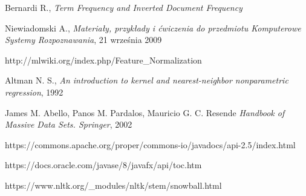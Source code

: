 \documentclass{classrep}
\begin{document}
\begin{thebibliography}{0}
Bernardi R., \textit{Term Frequency and Inverted Document Frequency}

Niewiadomski A., \textit{Materiały, przykłady i ćwiczenia do przedmiotu Komputerowe Systemy Rozpoznawania}, 21 września 2009 

http://mlwiki.org/index.php/Feature\_Normalization

Altman N. S., \textit{An introduction to kernel and nearest-neighbor nonparametric regression}, 1992

James M. Abello, Panos M. Pardalos, Mauricio G. C. Resende \textit{Handbook of Massive Data Sets. Springer}, 2002

https://commons.apache.org/proper/commons-io/javadocs/api-2.5/index.html

https://docs.oracle.com/javase/8/javafx/api/toc.htm

https://www.nltk.org/\_modules/nltk/stem/snowball.html

\end{thebibliography}
\end{document}
